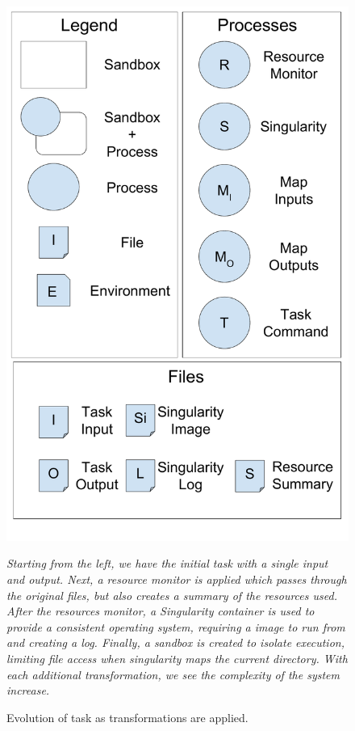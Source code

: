 \documentclass[conference]{IEEEtran}
\begin{document}
\begin{figure}[t]
\begin{minipage}[t]{0.22\textwidth}
  \includegraphics[width=\textwidth]{graphics/nested_legend.pdf}
\end{minipage}
\caption{Evolution of task as transformations are applied.} 
\small
\emph{ 
Starting from the left,
we have the initial task 
with a single input and output. 
Next, a resource monitor is applied which 
passes through the original files, 
but also creates a summary of the resources used.
After the resources monitor, a Singularity container
is used to provide a consistent operating system,
requiring a image to run from and creating a log.
Finally, a sandbox is created to isolate execution, 
limiting file access when singularity 
maps the current directory.
With each additional transformation, we see the complexity of
the system increase.
}
\label{figure:wrapping-of-task}
\end{figure}
\end{document}

